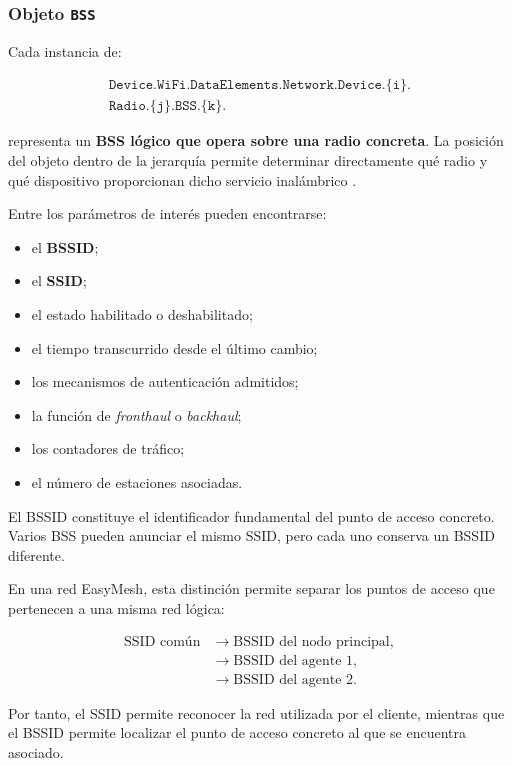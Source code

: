 \subsubsection*{Objeto \texttt{BSS}}

Cada instancia de:

\[
\begin{split}
    \texttt{Device.WiFi.DataElements.Network.Device.\{i\}.}\\
    \texttt{Radio.\{j\}.BSS.\{k\}.}
\end{split}
\]

representa un \textbf{BSS lógico que opera sobre una radio concreta}.
La posición del objeto dentro de la jerarquía permite determinar
directamente qué radio y qué dispositivo proporcionan dicho servicio
inalámbrico \cite{bbf_tr181}.

Entre los parámetros de interés pueden encontrarse:

\begin{itemize}
    \item el \textbf{BSSID};
    \item el \textbf{SSID};
    \item el estado habilitado o deshabilitado;
    \item el tiempo transcurrido desde el último cambio;
    \item los mecanismos de autenticación admitidos;
    \item la función de \textit{fronthaul} o
    \textit{backhaul};
    \item los contadores de tráfico;
    \item el número de estaciones asociadas.
\end{itemize}

El BSSID constituye el identificador fundamental del punto de acceso
concreto. Varios BSS pueden anunciar el mismo SSID, pero cada uno conserva
un BSSID diferente.

En una red EasyMesh, esta distinción permite separar los puntos de acceso
que pertenecen a una misma red lógica:

\[
\begin{aligned}
    \text{SSID común}
    &\longrightarrow \text{BSSID del nodo principal},\\
    &\longrightarrow \text{BSSID del agente 1},\\
    &\longrightarrow \text{BSSID del agente 2}.
\end{aligned}
\]

Por tanto, el SSID permite reconocer la red utilizada por el cliente,
mientras que el BSSID permite localizar el punto de acceso concreto al
que se encuentra asociado.

